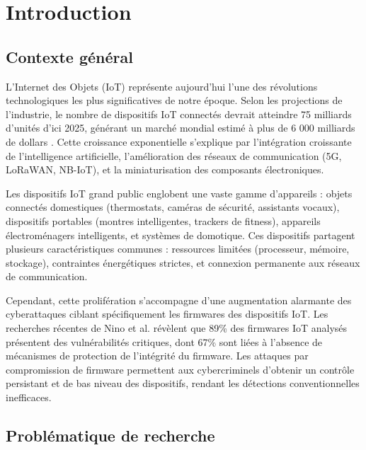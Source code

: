 
\chapter{Introduction}
\label{chap:introduction}

\section{Contexte général}

L'Internet des Objets (\ac{IoT}) représente aujourd'hui l'une des révolutions technologiques les plus significatives de notre époque. Selon les projections de l'industrie, le nombre de dispositifs \ac{IoT} connectés devrait atteindre 75 milliards d'unités d'ici 2025, générant un marché mondial estimé à plus de 6 000 milliards de dollars \cite{Statista2024IoTMarket}. Cette croissance exponentielle s'explique par l'intégration croissante de l'intelligence artificielle, l'amélioration des réseaux de communication (5G, LoRaWAN, NB-IoT), et la miniaturisation des composants électroniques.

Les dispositifs \ac{IoT} grand public englobent une vaste gamme d'appareils : objets connectés domestiques (thermostats, caméras de sécurité, assistants vocaux), dispositifs portables (montres intelligentes, trackers de fitness), appareils électroménagers intelligents, et systèmes de domotique. Ces dispositifs partagent plusieurs caractéristiques communes : ressources limitées (processeur, mémoire, stockage), contraintes énergétiques strictes, et connexion permanente aux réseaux de communication.

Cependant, cette prolifération s'accompagne d'une augmentation alarmante des cyberattaques ciblant spécifiquement les firmwares des dispositifs \ac{IoT}. Les recherches récentes de Nino et al. \cite{Nino2024UnveilingIoT} révèlent que 89\% des firmwares \ac{IoT} analysés présentent des vulnérabilités critiques, dont 67\% sont liées à l'absence de mécanismes de protection de l'intégrité du firmware. Les attaques par compromission de firmware permettent aux cybercriminels d'obtenir un contrôle persistant et de bas niveau des dispositifs, rendant les détections conventionnelles inefficaces.

\section{Problématique de recherche}

